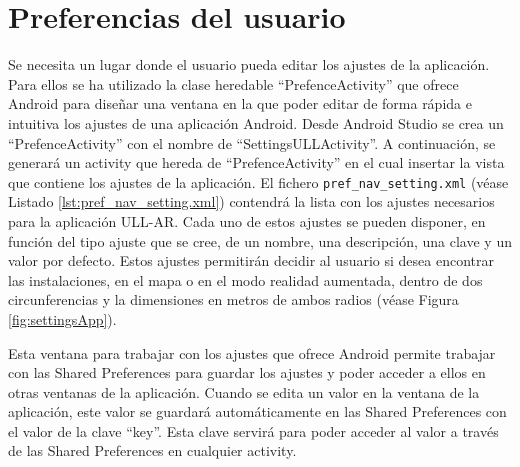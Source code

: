  

 
    
\section{Preferencias del usuario}

Se necesita un lugar donde el usuario pueda editar los ajustes de la aplicación. Para ellos se ha utilizado la clase heredable ``PrefenceActivity'' que ofrece Android para diseñar una ventana en la que poder editar de forma rápida e intuitiva los ajustes de una aplicación Android. Desde Android Studio se crea un ``PrefenceActivity'' con el nombre de ``SettingsULLActivity''. A continuación, se generará un activity que hereda de ``PrefenceActivity'' en el cual insertar la vista que contiene los ajustes de la aplicación. El fichero \texttt{pref\_nav\_setting.xml} (véase Listado \ref{lst:pref_nav_setting.xml}) contendrá la lista con los ajustes necesarios para la aplicación ULL-AR. Cada uno de estos ajustes se pueden disponer, en función del tipo ajuste que se cree, de un nombre, una descripción, una clave y un valor por defecto. Estos ajustes permitirán decidir al usuario si desea encontrar las instalaciones, en el mapa o en el modo realidad aumentada, dentro de dos circunferencias y la dimensiones en metros de ambos radios (véase Figura \ref{fig:settingsApp}).
 


Esta ventana para trabajar con los ajustes que ofrece Android permite trabajar con las Shared Preferences para guardar los ajustes y poder acceder a ellos en otras ventanas de la aplicación. Cuando se edita un valor en la ventana de la aplicación, este valor se guardará automáticamente en las Shared Preferences con el valor de la clave ``key''. Esta clave servirá para poder acceder al valor a través de las Shared Preferences en cualquier activity.

% 


